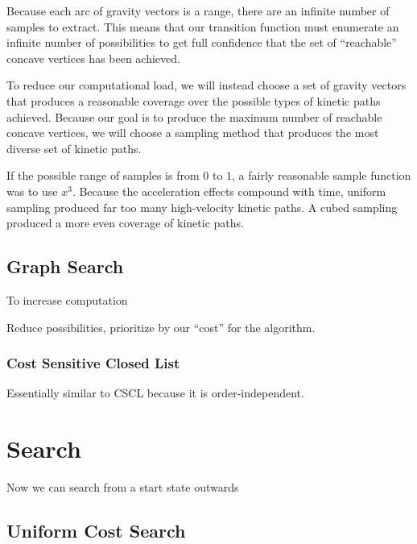 Because each arc of gravity vectors is a range, there are an infinite number of samples to extract. This means that our transition function must enumerate an infinite number of possibilities to get full confidence that the set of ``reachable'' concave vertices has been achieved.

To reduce our computational load, we will instead choose a set of gravity vectors that produces a reasonable coverage over the possible types of kinetic paths achieved. Because our goal is to produce the maximum number of reachable concave vertices, we will choose a sampling method that produces the most diverse set of kinetic paths.

If the possible range of samples is from $0$ to $1$, a fairly reasonable sample function was to use $x^3$. Because the acceleration effects compound with time, uniform sampling produced far too many high-velocity kinetic paths. A cubed sampling produced a more even coverage of kinetic paths.



	\subsection{Graph Search}

To increase computation

Reduce possibilities, prioritize by our ``cost'' for the algorithm.

		\subsubsection{Cost Sensitive Closed List}

Essentially similar to CSCL because it is order-independent.

\section{Search}

Now we can search from a start state outwards

	\subsection{Uniform Cost Search}

